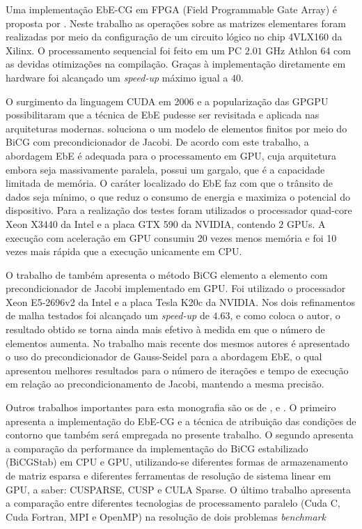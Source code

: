 \documentclass[
    12pt,               %
    openright,          %
    oneside,
    a4paper,            %
    english,            %
    french,             %
    spanish,            %
    brazil              %
    ]{abntex2}
\begin{document}
Uma implementação EbE-CG em FPGA (Field Programmable Gate Array) é proposta por . Neste trabalho as operações sobre as matrizes elementares foram realizadas por meio da configuração de um circuito lógico no chip 4VLX160 da Xilinx. O processamento sequencial foi feito em um PC $2.01$ GHz Athlon $64$ com as devidas otimizações na compilação. Graças à implementação diretamente em hardware foi alcançado um \textit{speed-up} máximo igual a $40$.

O surgimento da linguagem CUDA em 2006 e a popularização das GPGPU possibilitaram que a técnica de EbE pudesse ser revisitada e aplicada nas arquiteturas modernas.  soluciona o um modelo de elementos finitos por meio do BiCG com precondicionador de Jacobi.  De acordo com este trabalho, a abordagem EbE é adequada para o processamento em GPU, cuja arquitetura embora seja massivamente paralela, possui um gargalo, que é a  capacidade limitada de memória. O caráter localizado do EbE faz com que o trânsito de dados seja mínimo, o que reduz o consumo de energia e maximiza o potencial do dispositivo. Para a realização dos testes foram utilizados o processador quad-core Xeon X3440 da Intel e a placa GTX 590 da NVIDIA, contendo $2$ GPUs. A execução com aceleração em GPU consumiu 20 vezes menos memória e foi 10 vezes mais rápida que a execução unicamente em CPU.

O trabalho de  também apresenta o método BiCG elemento a elemento com precondicionador de Jacobi implementado em GPU. Foi utilizado o processador Xeon E5-2696v2 da Intel e a placa Tesla K20c da NVIDIA. Nos dois refinamentos de malha testados foi alcançado um \textit{speed-up} de $4.63$, e como coloca o autor, o resultado obtido se torna ainda mais efetivo à medida em que o número de elementos aumenta. No trabalho mais recente dos mesmos autores \cite{Yan2017} é apresentado o uso do precondicionador de Gauss-Seidel para a abordagem EbE, o qual apresentou melhores resultados para o número de iterações e tempo de execução em relação ao precondicionamento de Jacobi, mantendo a mesma precisão.

Outros trabalhos importantes para esta monografia são os de ,  e . O primeiro apresenta a implementação do EbE-CG e a técnica de atribuição das condições de contorno que também será empregada no presente trabalho. O segundo apresenta a comparação da performance da implementação do BiCG estabilizado (BiCGStab) em CPU e GPU, utilizando-se diferentes formas de armazenamento de matriz esparsa e diferentes ferramentas de resolução de sistema linear em GPU, a saber: CUSPARSE, CUSP e CULA Sparse. O último trabalho apresenta a comparação entre diferentes tecnologias de processamento paralelo (Cuda C, Cuda Fortran, MPI e OpenMP) na resolução de dois problemas \textit{benchmark}
\end{document}
